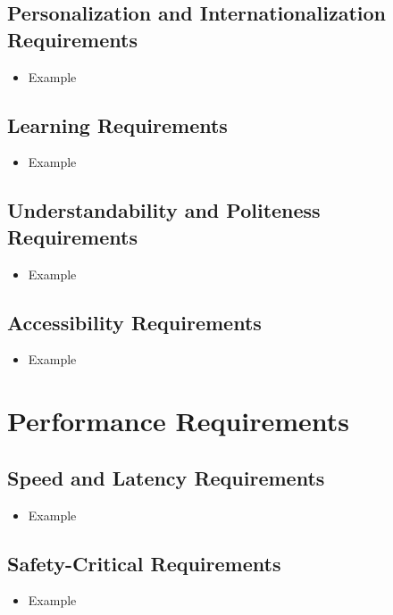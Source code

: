 \documentclass[12pt]{article}
\begin{document}
  \subsection{Personalization and Internationalization Requirements}
    \begin{itemize}
      \item Example
    \end{itemize}

  \subsection{Learning Requirements}
    \begin{itemize}
      \item Example
    \end{itemize}

  \subsection{Understandability and Politeness Requirements}
    \begin{itemize}
      \item Example
    \end{itemize}

  \subsection{Accessibility Requirements}
    \begin{itemize}
      \item Example
    \end{itemize}

\section{Performance Requirements}
  \subsection{Speed and Latency Requirements}
    \begin{itemize}
      \item Example
    \end{itemize}

  \subsection{Safety-Critical Requirements}
    \begin{itemize}
      \item Example
    \end{itemize}
\end{document}
